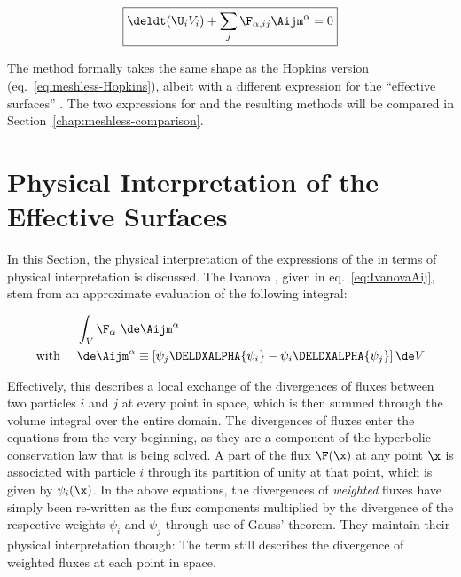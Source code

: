 \begin{align}
\boxed{
    \deldt (\U_i V_i) + \sum_j \F_{\alpha,ij} \Aijm^\alpha = 0 \label{eq:meshless-Ivanova}
}
\end{align}

The method formally takes the same shape as the Hopkins version (eq.~\ref{eq:meshless-Hopkins}),
albeit with a different expression for the ``effective surfaces'' \Aij. The two expressions for \Aij and the resulting methods will be compared in Section~\ref{chap:meshless-comparison}.




\section{Physical Interpretation of the Effective Surfaces}

In this Section, the physical interpretation of the expressions of the \Aij in terms of physical
interpretation is discussed. The Ivanova \Aij, given in eq.~\ref{eq:IvanovaAij}, stem from an
approximate evaluation of the following integral:

\begin{align}
& \int_V \F_\alpha \ \de \Aijm^\alpha \\
\text{with } \quad &
\de \Aijm^\alpha \equiv \left[ \psi_j \DELDXALPHA{\psi_i} - \psi_i \DELDXALPHA{\psi_j} \right] \de
V
\end{align}

Effectively, this describes a local exchange of the divergences of fluxes between two particles $i$
and $j$ at every point in space, which is then summed through the volume integral over the entire
domain. The divergences of fluxes enter the equations from the very beginning, as they are a
component of the hyperbolic conservation law that is being solved. A part of the flux $\F(\x)$ at
any point $\x$ is associated with particle $i$ through its partition of unity at that point, which
is given by $\psi_i(\x)$. In the above equations, the divergences of \emph{weighted} fluxes have
simply been re-written as the flux components multiplied by the divergence of the respective
weights $\psi_i$ and $\psi_j$ through use of Gauss' theorem. They maintain their physical interpretation though: The term still describes the divergence of weighted fluxes at each point in space.


